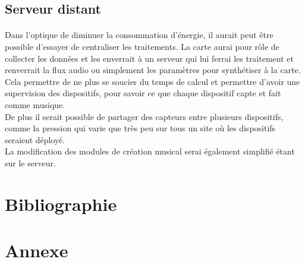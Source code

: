 \documentclass[a4paper, titlepage, oneside, 12pt]{article}%
\begin{document}
\subsection{Serveur distant}
\paragraph{}
Dans l'optique de diminuer la consommation d’énergie, il aurait peut être possible d'essayer de centraliser les traitements. La carte aurai pour rôle de collecter les données et les enverrait à un serveur qui lui ferrai les traitement et renverrait la flux audio ou simplement les paramètres pour synthétiser à la carte.\\
Cela permettre de ne plus se soucier du temps de calcul et permettre d'avoir une supervision des dispositifs, pour savoir ce que chaque dispositif capte et fait comme musique.\\
De plus il serait possible de partager des capteurs entre plusieurs dispositifs, comme la pression qui varie que très peu sur tous un site où les dispositifs seraient déployé.\\
La modification des modules de création musical serai également simplifié étant sur le serveur.
 

\newpage
\section{Bibliographie}
\nocite{*}



\newpage\section{Annexe}
\end{document}
